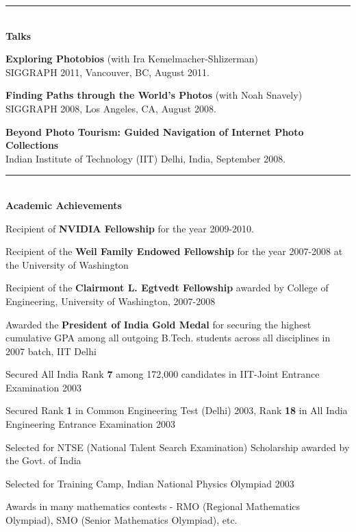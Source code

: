 \documentclass[11pt]{article}
\newenvironment{itemize*}%
  {\begin{itemize}%
    \setlength{\itemsep}{0pt}%
    \setlength{\parskip}{0pt}%
	}
  {\end{itemize}}
\begin{document}
\rule{6.5in}{2pt}
\\
\vspace{0.10in}
{\large \textbf{Talks}}
\begin{itemize*}
\item \textbf{Exploring Photobios} (with Ira Kemelmacher-Shlizerman) 
\\
SIGGRAPH 2011, Vancouver, BC, August 2011.
\item \textbf{Finding Paths through the World's Photos} (with Noah Snavely) 
\\
SIGGRAPH 2008, Los Angeles, CA, August 2008.
\item \textbf{Beyond Photo Tourism: Guided Navigation of Internet Photo Collections} 
\\
Indian Institute of Technology (IIT) Delhi, India, September 2008.
\end{itemize*}
\rule{6.5in}{2pt}
\\
\vspace{0.10in}
{\large \textbf{Academic Achievements}}
\begin{itemize*}
\item Recipient of \textbf{NVIDIA Fellowship} for the year 2009-2010.
\item Recipient of the \textbf{Weil Family Endowed Fellowship} for the year 2007-2008 at the University of Washington
\item Recipient of the \textbf{Clairmont L. Egtvedt Fellowship} awarded by College of Engineering, University of Washington, 2007-2008
\item Awarded  the \textbf{President of India Gold Medal} for securing the highest cumulative GPA among all outgoing B.Tech. students  across all disciplines in 2007 batch, IIT Delhi
\item Secured All India Rank \textbf{7} among 172,000 candidates in IIT-Joint Entrance Examination 2003
\item Secured Rank \textbf{1} in Common Engineering Test (Delhi) 2003, Rank \textbf{18} in All India Engineering Entrance Examination 2003
\item Selected for NTSE (National Talent Search Examination) Scholarship awarded by the Govt. of India
\item Selected for Training Camp, Indian  National Physics Olympiad 2003
\item Awards in many mathematics contests - RMO (Regional Mathematics Olympiad), SMO (Senior Mathematics Olympiad), etc.
\end{itemize*}
\end{document}
